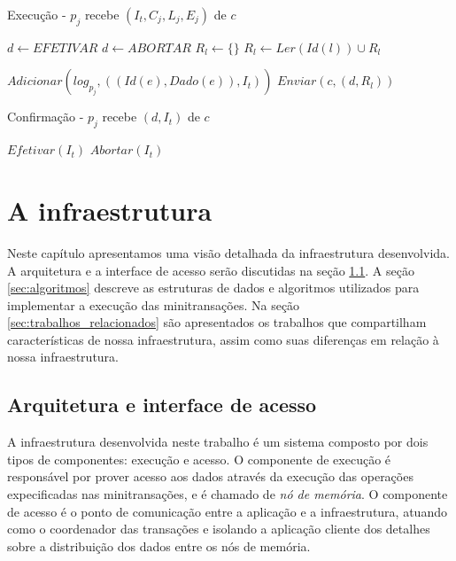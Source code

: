 \documentclass[11pt,twoside,a4paper]{book}
\begin{document}
\begin{algorithm}
\caption{Execução - $p_j$ recebe $(I_t, C_j, L_j, E_j)$ de $c$}
\label{alg:mini_participante1}
\begin{algorithmic}[1]
\State $d \gets EFETIVAR$
		\State $d \gets ABORTAR$
	\EndIf
\EndFor
\State $R_l \gets \{\}$
		\State $R_l \gets Ler(Id(l)) \cup R_l$
	\EndFor
	
		\State $Adicionar(log_{p_j}, ( (Id(e), Dado(e)), I_t ) )$
	\EndFor
\EndIf
\State $Enviar(c, (d, R_l))$
\end{algorithmic}
\end{algorithm}

\begin{algorithm}
\caption{Confirmação - $p_j$ recebe $(d, I_t)$ de $c$}
\label{alg:mini_participante2}
\begin{algorithmic}[1]
	\State $Efetivar(I_t)$
\Else
	\State $Abortar(I_t)$
\EndIf
\end{algorithmic}
\end{algorithm}

\chapter{A infraestrutura}
\label{chap:implementacao}
Neste capítulo apresentamos uma visão detalhada da infraestrutura desenvolvida. A arquitetura e a interface de acesso serão discutidas na seção \ref{sec:arquitetura}. A seção \ref{sec:algoritmos} descreve as estruturas de dados e algoritmos utilizados para implementar a execução das minitransações. Na seção \ref{sec:trabalhos_relacionados} são apresentados os trabalhos que compartilham características de nossa infraestrutura, assim como suas diferenças em relação à nossa infraestrutura. 


\section{Arquitetura e interface de acesso}
\label{sec:arquitetura}

A infraestrutura desenvolvida neste trabalho é um sistema composto por dois tipos de componentes: execução e acesso. O componente de execução é responsável por prover acesso aos dados através da execução das operações expecificadas nas minitransações, e é chamado de \emph{nó de memória}. O componente de acesso é o ponto de comunicação entre a aplicação e a infraestrutura, atuando como o coordenador das transações e isolando a aplicação cliente dos detalhes sobre a distribuição dos dados entre os nós de memória.
\end{document}
